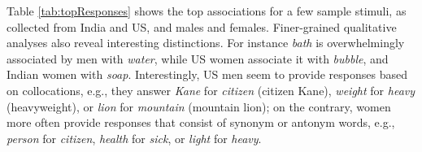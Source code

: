 \documentclass[11pt,letterpaper]{article}
\begin{document}
Table \ref{tab:topResponses} shows the top associations for a few sample stimuli, as collected from India and US, and males and females. Finer-grained qualitative analyses also reveal interesting distinctions. For instance {\it bath} is overwhelmingly associated by men with {\it water}, while US women associate it with {\it bubble}, and Indian women with {\it soap}. %
Interestingly, US men seem to provide responses based on collocations, e.g., they answer {\it Kane} for {\it citizen} (citizen Kane), {\it weight} for {\it heavy} (heavyweight), or {\it lion} for {\it mountain} (mountain lion); on the contrary, women more often provide responses that consist of synonym or antonym words, e.g., {\it person} for {\it citizen}, {\it health} for {\it sick}, or {\it light} for {\it heavy}. %
\end{document}
